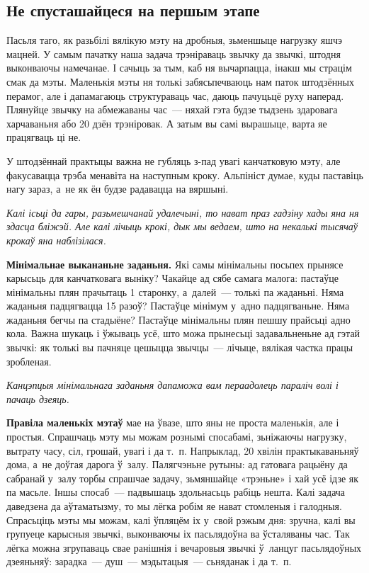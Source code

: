 \subsection*{Не спусташайцеся на першым этапе}

Пасьля таго, як разьбілі вялікую мэту на дробныя, зьменшыце нагрузку яшчэ мацней. У самым пачатку наша задача трэніраваць звычку да звычкі, штодня выконваючы намечанае. І сачыць за тым, каб ня вычарпацца, інакш мы страцім смак да мэты. Маленькія мэты ня толькі забясьпечваюць нам паток штодзённых перамог, але і дапамагаюць структураваць час, даюць пачуцьцё руху наперад. Плянуйце звычку на абмежаваны час~--- няхай гэта будзе тыдзень здаровага харчаваньня або 20 дзён трэніровак. А затым вы самі вырашыце, варта яе працягваць ці не.

У штодзённай практыцы важна не губляць з-пад увагі канчатковую мэту, але факусавацца трэба менавіта на наступным кроку. Альпініст думае, куды паставіць нагу зараз, а~не як ён будзе радавацца на вяршыні.

\emph{Калі ісьці да гары, разьмешчанай удалечыні, то нават праз гадзіну хады яна ня здасца бліжэй. Але калі лічыць крокі, дык мы ведаем, што на некалькі тысячаў крокаў яна наблізілася.}

\textbf{Мінімальнае выкананьне заданьня.} Які самы мінімальны посьпех прынясе карысьць для канчатковага выніку? Чакайце ад сябе самага малога: пастаўце мінімальны плян прачытаць 1 старонку, а~далей~--- толькі па жаданьні. Няма жаданьня падцягвацца 15 разоў? Пастаўце мінімум у~адно падцягваньне. Няма жаданьня бегчы па стадыёне? Пастаўце мінімальны плян пешшу прайсьці адно кола. Важна шукаць і ўжываць усё, што можа прынесьці задавальненьне ад гэтай звычкі: як толькі вы пачняце цешыцца звычцы~--- лічыце, вялікая частка працы зробленая.

\emph{Канцэпцыя мінімальнага заданьня дапаможа вам пераадолець параліч волі і пачаць дзеяць.}

\textbf{Правіла маленькіх мэтаў} мае на ўвазе, што яны не проста маленькія, але і простыя. Спрашчаць мэту мы можам рознымі спосабамі, зьніжаючы нагрузку, вытрату часу, сіл, грошай, увагі і да т.~п. Напрыклад, 20 хвілін практыкаваньняў дома, а~не доўгая дарога ў~залу. Палягчэньне рутыны: ад гатовага рацыёну да сабранай у~залу торбы спрашчае задачу, зьмяншайце «трэньне» і хай усё ідзе як па масьле. Іншы спосаб~--- падвышаць здольнасьць рабіць нешта. Калі задача даведзена да аўтаматызму, то мы лёгка робім яе нават стомленыя і галодныя. Спрасьціць мэты мы можам, калі ўпляцём іх у~свой рэжым дня: зручна, калі вы групуеце карысныя звычкі, выконваючы іх пасьлядоўна ва ўсталяваны час. Так лёгка можна згрупаваць свае ранішнія і вечаровыя звычкі ў~ланцуг пасьлядоўных дзеяньняў: зарадка~--- душ~--- мэдытацыя~--- сьняданак і да т.~п.

